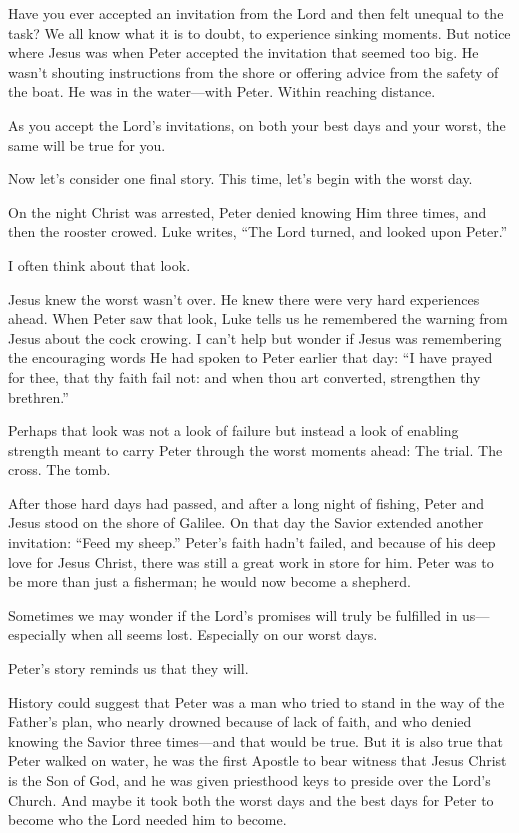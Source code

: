 \documentclass[letterpaper, 11pt]{report}
\newcommand{\intalkheader}[1]{
    \vspace{0.75em}
    \noindent{\normalsize\bfseries #1}
    \par\nopagebreak %
    \vspace{0.25em}
    \nopagebreak     %
}
\begin{document}
Have you ever accepted an invitation from the Lord and then felt unequal to the task? We all know what it is to doubt, to experience sinking moments. But notice where Jesus was when Peter accepted the invitation that seemed too big. He wasn’t shouting instructions from the shore or offering advice from the safety of the boat. He was in the water—with Peter. Within reaching distance.

As you accept the Lord’s invitations, on both your best days and your worst, the same will be true for you.

\intalkheader{Promised Blessings}

Now let’s consider one final story. This time, let’s begin with the worst day.

On the night Christ was arrested, Peter denied knowing Him three times, and then the rooster crowed. Luke writes, “The Lord turned, and looked upon Peter.”

I often think about that look.

Jesus knew the worst wasn’t over. He knew there were very hard experiences ahead. When Peter saw that look, Luke tells us he remembered the warning from Jesus about the cock crowing. I can’t help but wonder if Jesus was remembering the encouraging words He had spoken to Peter earlier that day: “I have prayed for thee, that thy faith fail not: and when thou art converted, strengthen thy brethren.”

Perhaps that look was not a look of failure but instead a look of enabling strength meant to carry Peter through the worst moments ahead: The trial. The cross. The tomb.

After those hard days had passed, and after a long night of fishing, Peter and Jesus stood on the shore of Galilee. On that day the Savior extended another invitation: “Feed my sheep.” Peter’s faith hadn’t failed, and because of his deep love for Jesus Christ, there was still a great work in store for him. Peter was to be more than just a fisherman; he would now become a shepherd.

Sometimes we may wonder if the Lord’s promises will truly be fulfilled in us—especially when all seems lost. Especially on our worst days.

Peter’s story reminds us that they will.

\intalkheader{For the Strength of Youth}

History could suggest that Peter was a man who tried to stand in the way of the Father’s plan, who nearly drowned because of lack of faith, and who denied knowing the Savior three times—and that would be true. But it is also true that Peter walked on water, he was the first Apostle to bear witness that Jesus Christ is the Son of God, and he was given priesthood keys to preside over the Lord’s Church. And maybe it took both the worst days and the best days for Peter to become who the Lord needed him to become.
\end{document}
